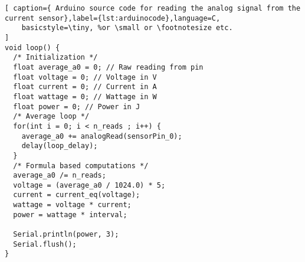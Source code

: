 \begin{lstlisting}[ caption={ Arduino source code for reading the analog signal from the current sensor},label={lst:arduinocode},language=C,
    basicstyle=\tiny, %or \small or \footnotesize etc.
]
void loop() {
  /* Initialization */
  float average_a0 = 0; // Raw reading from pin
  float voltage = 0; // Voltage in V
  float current = 0; // Current in A
  float wattage = 0; // Wattage in W
  float power = 0; // Power in J
  /* Average loop */
  for(int i = 0; i < n_reads ; i++) {
    average_a0 += analogRead(sensorPin_0);
    delay(loop_delay);
  }
  /* Formula based computations */
  average_a0 /= n_reads;
  voltage = (average_a0 / 1024.0) * 5;
  current = current_eq(voltage);
  wattage = voltage * current;
  power = wattage * interval;

  Serial.println(power, 3);
  Serial.flush();
}

\end{lstlisting}
